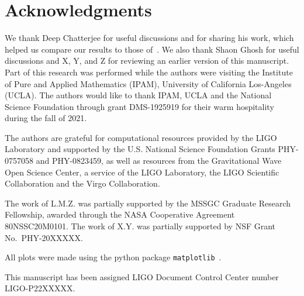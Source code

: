 \section*{Acknowledgments}
We thank Deep Chatterjee for useful discussions and for sharing his work, which
helped us compare our results to those of~\cite{Chatterjee:2019avs}. We also
thank Shaon Ghosh for useful discussions and X, Y, and Z for reviewing an
earlier version of this manuscript. Part of this research was performed while
the authors were visiting the Institute of Pure and Applied Mathematics (IPAM), 
University of California Los-Angeles (UCLA). The authors would like to thank 
IPAM, UCLA and the National Science Foundation through grant DMS-1925919 for
their warm hospitality during the fall of 2021. 
%

The authors are grateful for computational resources provided by the LIGO 
Laboratory and supported by the U.S. National Science Foundation Grants 
PHY-0757058 and PHY-0823459, as well as resources from the Gravitational Wave
Open Science Center, a service of the LIGO Laboratory, the LIGO Scientific 
Collaboration and the Virgo Collaboration.
%

The work of L.M.Z. was partially supported by the MSSGC Graduate
Research Fellowship, awarded through the NASA Cooperative Agreement
80NSSC20M0101. 
%
The work of X.Y. was partially supported by NSF Grant No.~PHY-20XXXXX.
%

All plots were made using the python package \texttt{matplotlib}~\cite{Hunter:2007ouj}.

This manuscript has been assigned LIGO Document Control Center number LIGO-P22XXXXX.
